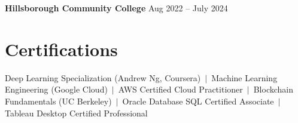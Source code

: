 \documentclass[11pt,letterpaper]{article}
\begin{document}
\vspace{3pt}

\textbf{Hillsborough Community College} \hfill Aug 2022 -- July 2024

\vspace{3pt}

\section{Certifications}
Deep Learning Specialization (Andrew Ng, Coursera) \,$\vert$\,
Machine Learning Engineering (Google Cloud) \,$\vert$\,
AWS Certified Cloud Practitioner \,$\vert$\,
Blockchain Fundamentals (UC Berkeley) \,$\vert$\,
Oracle Database SQL Certified Associate \,$\vert$\,
Tableau Desktop Certified Professional
\end{document}
